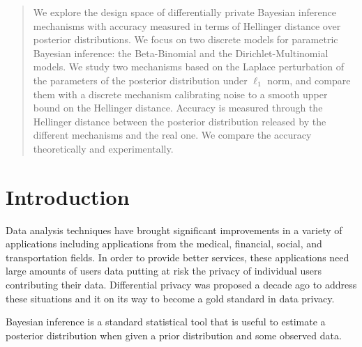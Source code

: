 \documentclass{article}
\begin{document}
\begin{abstract}
We explore the design space of differentially private Bayesian
inference mechanisms with accuracy measured in terms of Hellinger
distance over posterior distributions.  
We focus on two discrete models for parametric Bayesian
inference: the Beta-Binomial and the Dirichlet-Multinomial
models. We study two mechanisms based on the 
Laplace perturbation of the parameters of the posterior distribution under
$\ell_1$ norm, and compare them with a discrete mechanism
calibrating noise to a smooth upper bound on the Hellinger distance.
Accuracy is measured through the Hellinger distance between the posterior
distribution released by the different mechanisms and the real one.
We compare the accuracy theoretically and experimentally.
\end{abstract}





\section{Introduction}
\label{sec_intro}
Data analysis techniques have brought significant improvements in a
variety of applications including applications from the medical,
financial, social, and transportation fields. In order to provide
better services, these applications need large amounts of users data
putting at risk the privacy of individual users contributing their data. 
Differential privacy was proposed a decade ago to address these
situations and it on its way to become a gold standard in data
privacy.  

Bayesian inference is a standard statistical tool that is useful to
estimate a posterior distribution when given a prior distribution and
some observed data. 
\end{document}
